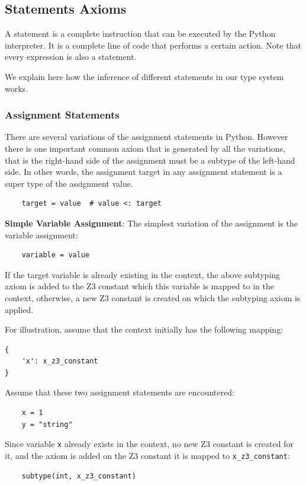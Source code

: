 \subsection{Statements Axioms}
A statement is a complete instruction that can be executed by the Python interpreter. It is a complete line of code that performs a certain action. Note that every expression is also a statement.

We explain here how the inference of different statements in our type system works.

\subsubsection{Assignment Statements}
There are several variations of the assignment statements in Python. However there is one important common axiom that is generated by all the variations, that is the right-hand side of the assignment must be a subtype of the left-hand side. In other words, the assignment target in any assignment statement is a super type of the assignment value.

\begin{lstlisting}
	target = value  # value <: target
\end{lstlisting}


\textbf{Simple Variable Assignment}: The simplest variation of the assignment is the variable assignment:
\begin{lstlisting}
	variable = value
\end{lstlisting}

If the target variable is already existing in the context, the above subtyping axiom is added to the Z3 constant which this variable is mapped to in the context, otherwise, a new Z3 constant is created on which the subtyping axiom is applied.

For illustration, assume that the context initially has the following mapping:
\begin{lstlisting}
{
	'x': x_z3_constant
}
\end{lstlisting}

Assume that these two assignment statements are encountered:
\begin{lstlisting}
	x = 1
	y = "string"
\end{lstlisting}

Since variable \lstinline|x| already exists in the context, no new Z3 constant is created for it, and the axiom is added on the Z3 constant it is mapped to \lstinline|x_z3_constant|:
\begin{lstlisting}
	subtype(int, x_z3_constant)
\end{lstlisting}

